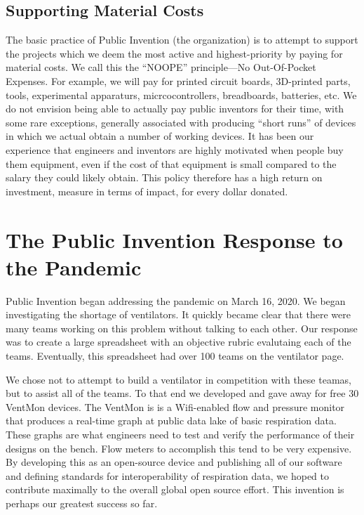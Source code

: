 \documentclass[
	fontsize=10pt, %
	twoside=false, %
	secnumdepth=1, %
]{kaobook}
\begin{document}
\section{Supporting Material Costs}
\label{chp:material}

The basic practice of Public Invention (the organization) is to attempt to
support the projects which we deem the most active and highest-priority
by paying for material costs.
We call this the ``NOOPE'' principle---No Out-Of-Pocket Expenses.
For example, we will pay for printed circuit boards, 3D-printed parts, tools,
experimental apparaturs, micrcocontrollers, breadboards, batteries, etc.
We do not envision being able to actually pay public inventors for their
time, with some rare exceptions, generally associated with producing
``short runs'' of devices in which we actual obtain a number of working devices.
It has been our experience that engineers and inventors are highly motivated when people
buy them equipment, even if the cost of that equipment is small compared to the
salary they could likely obtain.
This policy therefore has a high return on investment, measure in terms of impact,
for every dollar donated.

\chapter{The Public Invention Response to the Pandemic}

Public Invention began addressing the pandemic on March 16, 2020.
We began investigating the shortage of ventilators.
It quickly became clear that there were many teams working on this
problem without talking to each other.
Our response was to create a large spreadsheet with an objective
rubric evalutaing each of the teams.
Eventually, this spreadsheet had over 100 teams on the ventilator
page.

We chose not to attempt to build a ventilator in competition with
these teamas, but to assist all of the teams.
To that end we developed and gave away for free 30 VentMon devices.
The VentMon is is a Wifi-enabled flow and pressure monitor that
produces a real-time graph at public data lake of basic respiration
data.
These graphs are what engineers need to test and verify the performance
of their designs on the bench.
Flow meters to accomplish this tend to be very expensive.
By developing this as an open-source device and publishing all of our
software and defining standards for interoperability of respiration
data, we hoped to contribute maximally to the overall global
open source effort. This invention is perhaps our greatest success
so far.
\end{document}

